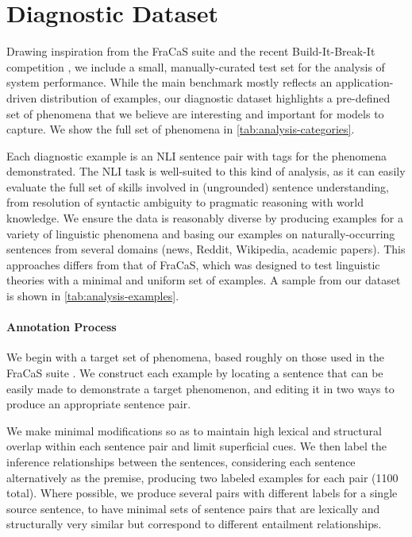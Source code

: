 \section{Diagnostic Dataset}

Drawing inspiration from the FraCaS suite \citep{cooper96fracas} and the recent Build-It-Break-It competition \citep{ettinger2017towards}, we include a small, manually-curated test set for the analysis of system performance. While the main benchmark mostly reflects an application-driven distribution of examples, our diagnostic dataset highlights a pre-defined set of phenomena that we believe are interesting and important for models to capture. We show the full set of phenomena in \autoref{tab:analysis-categories}.

Each diagnostic example is an NLI sentence pair with tags for the phenomena demonstrated. The NLI task is well-suited to this kind of analysis, as it can easily evaluate the full set of skills involved in (ungrounded) sentence understanding, from resolution of syntactic ambiguity to pragmatic reasoning with world knowledge. We ensure the data is reasonably diverse by producing examples for a variety of linguistic phenomena and basing our examples on naturally-occurring sentences from several domains (news, Reddit, Wikipedia, academic papers). This approaches differs from that of FraCaS, which was designed to test linguistic theories with a minimal and uniform set of examples. A sample from our dataset is shown in \autoref{tab:analysis-examples}. 

\paragraph{Annotation Process} We begin with a target set of phenomena, based roughly on those used in the FraCaS suite \citep{cooper96fracas}. We construct each example by locating a sentence that can be easily made to demonstrate a target phenomenon, and editing it in two ways to produce an appropriate sentence pair.

We make minimal modifications so as to maintain high lexical and structural overlap within each sentence pair and limit superficial cues. We then label the inference relationships  between the sentences, considering each sentence alternatively as the premise, producing two labeled examples for each pair (1100 total). Where possible, we produce several pairs with different labels for a single source sentence, to have minimal sets of sentence pairs that are lexically and structurally very similar but correspond to different entailment relationships.

